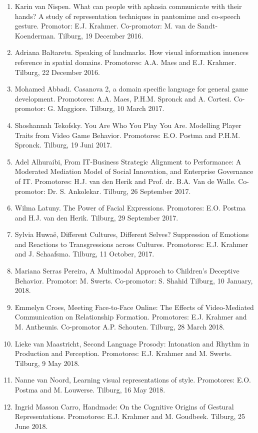 \begin{enumerate}
\item{ Karin van Nispen. What can people with aphasia communicate with their 
hands?
A study of representation techniques in pantomime and co-speech gesture.
Promotor: E.J. Krahmer. Co-promotor: M. van de Sandt-Koenderman. Tilburg,
19 December 2016.}
\item{ Adriana Baltaretu. Speaking of landmarks. How visual information 
inuences reference in
spatial domains. Promotores: A.A. Maes and E.J. Krahmer. Tilburg, 22 December 
2016.}
\item{ Mohamed Abbadi. Casanova 2, a domain specific language for general game 
development.
Promotores: A.A. Maes, P.H.M. Spronck and A. Cortesi. Co-promotor: G. Maggiore. Tilburg,
10 March 2017.}
\item{ Shoshannah Tekofsky. You Are Who You Play You Are. Modelling Player 
Traits from Video Game
Behavior. Promotores: E.O. Postma and P.H.M. Spronck. Tilburg, 19 Juni 2017.}
\item{ Adel Alhuraibi, From IT-Business Strategic Alignment to Performance: A 
Moderated Mediation
Model of Social Innovation, and Enterprise Governance of IT. Promotores: H.J. van den Herik
and Prof. dr. B.A. Van de Walle. Co-promotor: Dr. S. Ankolekar. Tilburg, 26 
September 2017.}
\item{ Wilma Latuny. The Power of Facial Expressions. Promotores: E.O. Postma 
and H.J. van den
Herik. Tilburg, 29 September 2017.}
\item{ Sylvia Huwaë, Different Cultures, Different Selves? Suppression of 
Emotions and Reactions to
Transgressions across Cultures. Promotores: E.J. Krahmer and J. Schaafsma. Tilburg,
11 October, 2017.}
\item{ Mariana Serras Pereira, A Multimodal Approach to Children’s Deceptive 
Behavior.
Promotor: M. Swerts. Co-promotor: S. Shahid Tilburg, 10 January, 2018.}
\item{ Emmelyn Croes, Meeting Face-to-Face Online: The Effects of 
Video-Mediated Communication
on Relationship Formation. Promotores: E.J. Krahmer and M. Antheunis. Co-promotor A.P.
Schouten. Tilburg, 28 March 2018.}
\item{Lieke van Maastricht, Second Language Prosody: Intonation and Rhythm in 
Production and Perception. Promotores: E.J. Krahmer and M. Swerts. Tilburg, 9 
May 2018.}
\item{Nanne van Noord, Learning visual representations of style. Promotores: 
E.O.  Postma and
M. Louwerse. Tilburg, 16 May 2018.}
\item{Ingrid Masson Carro, Handmade: On the Cognitive Origins of Gestural Representations. Promotores: E.J. Krahmer and M. Goudbeek. Tilburg, 25 June 2018.}

\end{enumerate}
